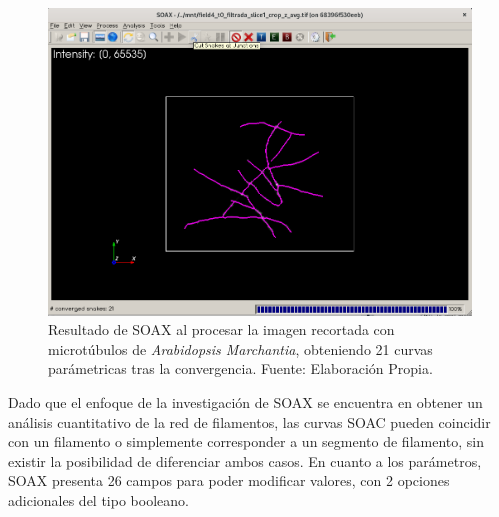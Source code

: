 \begin{figure}[h]
    \centering
    \includegraphics[scale=0.3]{evalImages/field4-soax.png}
    \caption[Resultado de convergencia de curvas SOAC]{Resultado de SOAX al procesar la imagen recortada con microt\'ubulos de {\it Arabidopsis Marchantia}, obteniendo 21 curvas par\'ametricas tras la convergencia. Fuente: Elaboraci\'on Propia.}
    \label{fig:SOAXexampleComputed}
\end{figure}

Dado que el enfoque de la investigaci\'on de SOAX se encuentra en obtener un an\'alisis cuantitativo de la red de filamentos, las curvas SOAC pueden coincidir con un filamento o simplemente corresponder a un segmento de filamento, sin existir la posibilidad de diferenciar ambos casos. En cuanto a los par\'ametros, SOAX presenta 26 campos para poder modificar valores, con 2 opciones adicionales del tipo booleano.

